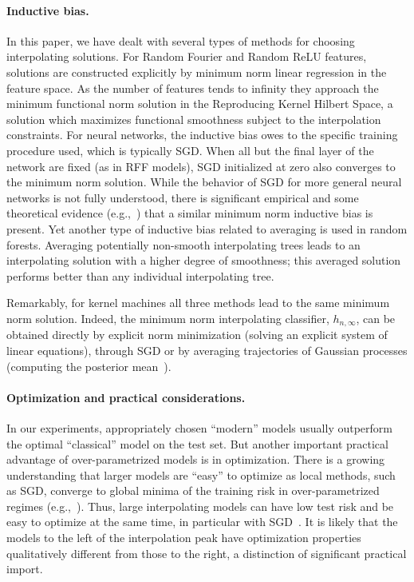 \documentclass[11pt]{article}
\newcommand\optninf{h_{n,\infty}}
\begin{document}
\paragraph{Inductive bias.}
In this paper, we have dealt with several types of methods for choosing interpolating solutions.
For Random Fourier and Random ReLU features, solutions are constructed explicitly by minimum norm linear regression in the feature space.
As the number of features tends to infinity they approach the minimum functional norm solution in the Reproducing Kernel Hilbert Space, a solution which maximizes functional smoothness subject to the interpolation constraints. 
For neural networks, the inductive bias owes to the specific training procedure used, which is typically SGD.
When all but the final layer of the network are fixed (as in RFF models), SGD initialized at zero also converges to the minimum norm solution.
While the behavior of SGD for more general neural networks is not fully understood, there is significant empirical and some theoretical evidence (e.g.,~\cite{gunasekar2017implicit}) that a similar minimum norm inductive bias is present.
Yet another type of inductive bias related to averaging is used in random forests.
Averaging potentially non-smooth interpolating trees leads to an interpolating solution with a higher degree of smoothness; this averaged solution performs better than any individual interpolating tree.

Remarkably, for kernel machines all three methods lead to the same minimum norm solution. Indeed, the minimum norm interpolating classifier, $\optninf$, can be obtained directly by explicit norm minimization (solving an explicit system of linear equations), through SGD or by averaging trajectories of Gaussian processes (computing the posterior mean~\cite{rasmussen2004gaussian}).  

\paragraph{Optimization and practical considerations.}
In our experiments, appropriately chosen ``modern''  models usually outperform the optimal ``classical'' model on the test set.
But another important practical advantage of over-parametrized models is in  optimization.
There is a growing understanding that larger models are ``easy'' to optimize as local methods, such as SGD, converge to global minima of the training risk in over-parametrized regimes (e.g.,~\cite{soltanolkotabi2018theoretical}).
Thus, large interpolating models can have low test risk and be easy to  optimize at the same time, in particular with SGD~\cite{ma2018power}.
It is likely that the models to the left of the interpolation peak have optimization properties qualitatively different from those to the right, a distinction of significant practical import.
\end{document}
